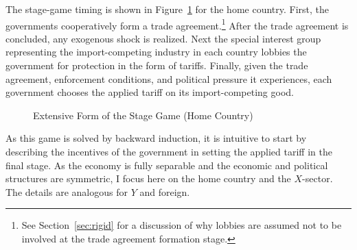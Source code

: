 \documentclass[12pt]{article}
\begin{document}
The stage-game timing is shown in Figure~\ref{fig:ext} for the home country. First, the governments cooperatively form a trade agreement.\footnote{See Section~\ref{sec:rigid} for a discussion of why lobbies are assumed not to be involved at the trade agreement formation stage.} After the trade agreement is concluded, any exogenous shock is realized. Next the special interest group representing the import-competing industry in each country lobbies the government for protection in the form of tariffs. Finally, given the trade agreement, enforcement conditions, and political pressure it experiences, each government chooses the applied tariff on its import-competing good.

\begin{figure}
	\begin{center}
		
	\end{center}
	\caption{Extensive Form of the Stage Game (Home Country)\label{fig:ext}}
\end{figure}


As this game is solved by backward induction, it is intuitive to start by describing the incentives of the government in setting the applied tariff in the final stage. As the economy is fully separable and the economic and political structures are symmetric, I focus here on the home country and the $X$-sector. The details are analogous for $Y$ and foreign.
\end{document}
